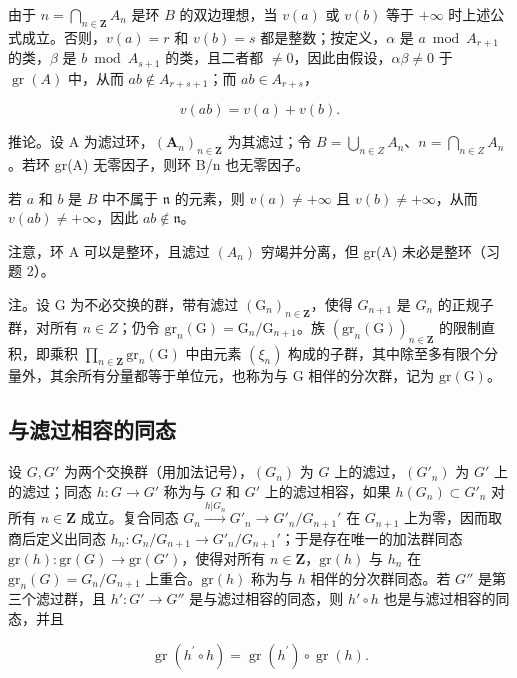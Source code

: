 	由于 \(n = \bigcap_{n \in \mathbf{Z}} A_n\) 是环 \(B\) 的双边理想，当 \(v(a)\) 或 \(v(b)\) 等于 \(+\infty\) 时上述公式成立。否则，\(v(a) = r\) 和 \(v(b) = s\) 都是整数；按定义，\(\alpha\) 是 \(a \bmod A_{r+1}\) 的类，\(\beta\) 是 \(b \bmod A_{s+1}\) 的类，且二者都 \(\neq 0\)，因此由假设，\(\alpha \beta \neq 0\) 于 \(\operatorname{gr}(A)\) 中，从而 \(ab \notin A_{r+s+1}\)；而 \(ab \in A_{r+s}\)，

\[
v (a b) = v (a) + v (b).
\]

推论。设 A 为滤过环，\((\mathbf{A}_{n})_{n\in\mathbf{Z}}\) 为其滤过；令 \(B=\bigcup_{n\in Z}A_{n}\)、\(n=\bigcap_{n\in Z}A_{n}\)。若环 gr(A) 无零因子，则环 B/n 也无零因子。

	若 \(a\) 和 \(b\) 是 \(B\) 中不属于 \(\mathfrak{n}\) 的元素，则 \(v(a) \neq +\infty\) 且 \(v(b) \neq +\infty\)，从而 \(v(ab) \neq +\infty\)，因此 \(ab \notin \mathfrak{n}\)。

注意，环 A 可以是整环，且滤过 \((A_{n})\) 穷竭并分离，但 gr(A) 未必是整环（习题 2）。

	注。设 G 为不必交换的群，带有滤过 \((\mathrm{G}_{n})_{n\in\mathbf{Z}}\)，使得 \(G_{n+1}\) 是 \(G_{n}\) 的正规子群，对所有 \(n\in Z\)；仍令 \(\mathrm{gr}_{n}(\mathrm{G})=\mathrm{G}_{n}/\mathrm{G}_{n+1}\)。族 \((\mathrm{gr}_{n}(\mathrm{G}))_{n\in\mathbf{Z}}\) 的限制直积，即乘积 \(\prod_{n\in\mathbf{Z}}\mathrm{gr}_{n}(\mathrm{G})\) 中由元素 \((\xi_{n})\) 构成的子群，其中除至多有限个分量外，其余所有分量都等于单位元，也称为与 G 相伴的分次群，记为 \(\mathrm{gr}(\mathrm{G})\)。

\subsection{与滤过相容的同态}

	设 \(G, G'\) 为两个交换群（用加法记号），\((G_n)\) 为 \(G\) 上的滤过，\((G'_n)\) 为 \(G'\) 上的滤过；同态 \(h: G \to G'\) 称为与 \(G\) 和 \(G'\) 上的滤过相容，如果 \(h(G_n) \subset G'_n\) 对所有 \(n \in \mathbf{Z}\) 成立。复合同态 \(G_n \xrightarrow{h|G_n} G'_n \longrightarrow G'_n / G_{n+1}'\) 在 \(G_{n+1}\) 上为零，因而取商后定义出同态 \(h_n: G_n / G_{n+1} \to G'_n / G_{n+1}'\)；于是存在唯一的加法群同态 \(\text{gr}(h): \text{gr}(G) \to \text{gr}(G')\)，使得对所有 \(n \in \mathbf{Z}\)，\(\text{gr}(h)\) 与 \(h_n\) 在 \(\text{gr}_n(G) = G_n / G_{n+1}\) 上重合。\(\text{gr}(h)\) 称为与 \(h\) 相伴的分次群同态。若 \(G''\) 是第三个滤过群，且 \(h': G' \to G''\) 是与滤过相容的同态，则 \(h' \circ h\) 也是与滤过相容的同态，并且

\[
\operatorname{gr} (h ^ {\prime} \circ h) = \operatorname{gr} (h ^ {\prime}) \circ \operatorname{gr} (h).\tag{12}
\]

